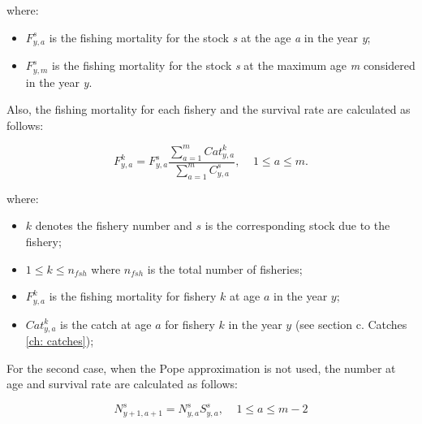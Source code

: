 \documentclass{article}
\begin{document}
where:

\begin{itemize}
    \item $F^s_{y,a}$ is the fishing mortality for the stock \textit{s} at the age \textit{a} in the year \textit{y};

    \item $F^s_{y,m}$ is the fishing mortality for the stock \textit{s} at the maximum age \textit{m} considered in the year \textit{y}.
\end{itemize}

\hfill

Also, the fishing mortality for each fishery and the survival rate are calculated as follows:

\begin{equation}
F^k_{y,a}=F^s_{y,a}\dfrac{\sum_{a = 1} ^{m} Cat^k_{y,a}}{\sum_{a=1} ^{m} C^s_{y,a}}, \ \ \ \ \ 1\leq a \leq m.
\end{equation}


where:
\begin{itemize}
    \item $k$ denotes the fishery number and $s$ is the corresponding stock due to the fishery;
    
    \item $1\leq k \leq n_{fsh}$ where $n_{fsh}$ is the total number of fisheries;
   
    \item $F^k_{y,a}$ is the fishing mortality for fishery $k$ at age $a$ in the year $y$;

    \item $Cat^k_{y,a}$ is the catch at age $a$ for fishery $k$ in the year $y$ (see section c. Catches \ref{ch: catches});
    
\end{itemize}

\hfill

For the second case, when the Pope approximation is not used, the number at age and survival rate are calculated as follows:

\begin{equation}
N^s_{y+1,a+1}=N^s_{y,a}S^s_{y,a}, \ \ \ \ \ 1\leq a \leq m-2
\end{equation}
\end{document}
